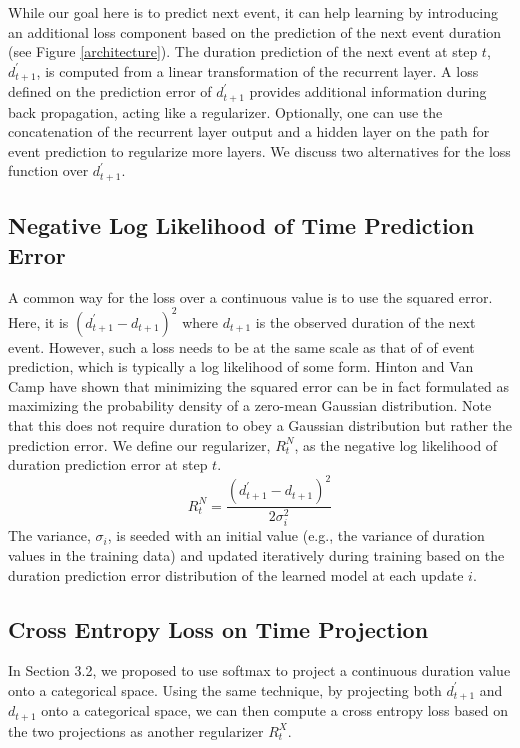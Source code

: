 \documentclass{article} %
\begin{document}
While our goal here is to predict next event, it can help learning by introducing an additional loss component based on the prediction of the next event duration (see Figure \ref{architecture}). The duration prediction of the next event at step $t$, $d_{t+1}^\prime$, is computed from a linear transformation of the recurrent layer. A loss defined on the prediction error of $d_{t+1}^\prime$ provides additional information during back propagation, acting like a regularizer. Optionally, one can use the concatenation of the recurrent layer output and a hidden layer on the path for event prediction to regularize more layers. We discuss two alternatives for the loss function over $d_{t+1}^\prime$.

\subsection{Negative Log Likelihood of Time Prediction Error}

A common way for the loss over a continuous value is to use the squared error. Here, it is $(d_{t+1}^\prime-d_{t+1})^2$ where $d_{t+1}$ is the observed duration of the next event. However, such a loss needs to be at the same scale as that of of event prediction, which is typically a log likelihood of some form. Hinton and Van Camp \citep{Hinton:1993:KNN:168304.168306} have shown that minimizing the squared error can be in fact formulated as maximizing the probability density of a zero-mean Gaussian distribution. Note that this does not require duration to obey a Gaussian distribution but rather the prediction error. We define our regularizer, $R_{t}^N$, as the negative log likelihood of duration prediction error at step $t$. 
\begin{equation}
    R_{t}^N=\dfrac{(d_{t+1}^\prime-d_{t+1})^2}{2\sigma_{i}^2}
\end{equation}
The variance, $\sigma_{i}$, is seeded with an initial value (e.g., the variance of duration values in the training data) and updated iteratively during training based on the duration prediction error distribution of the learned model at each update $i$.

\subsection{Cross Entropy Loss on Time Projection}

In Section 3.2, we proposed to use softmax to project a continuous duration value onto a categorical space. Using the same technique, by projecting both $d_{t+1}^\prime$ and $d_{t+1}$ onto a categorical space, we can then compute a cross entropy loss based on the two projections as another regularizer $R_{t}^X$. 
\end{document}
